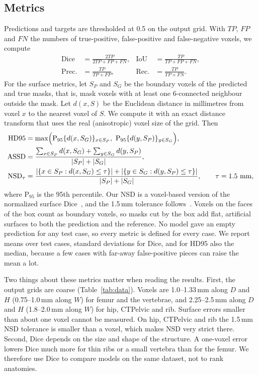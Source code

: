 \documentclass[11pt]{article}
\begin{document}
\subsection{Metrics}
Predictions and targets are thresholded at 0.5 on the output grid. With $TP$, $FP$ and $FN$ the numbers of true-positive, false-positive and false-negative voxels, we compute
\begin{align}
\mathrm{Dice}&=\frac{2TP}{2TP+FP+FN}, & \mathrm{IoU}&=\frac{TP}{TP+FP+FN},\nonumber\\
\mathrm{Prec.}&=\frac{TP}{TP+FP}, & \mathrm{Rec.}&=\frac{TP}{TP+FN}.
\end{align}
For the surface metrics, let $S_P$ and $S_G$ be the boundary voxels of the predicted and true masks, that is, mask voxels with at least one 6-connected neighbour outside the mask. Let $d(x,S)$ be the Euclidean distance in millimetres from voxel $x$ to the nearest voxel of $S$. We compute it with an exact distance transform that uses the real (anisotropic) voxel size of the grid. Then
\begin{align}
\mathrm{HD95}&=\max\Bigl(\mathrm{P}_{95}\{d(x,S_G)\}_{x\in S_P},\ \mathrm{P}_{95}\{d(y,S_P)\}_{y\in S_G}\Bigr),\\
\mathrm{ASSD}&=\frac{\sum_{x\in S_P}d(x,S_G)+\sum_{y\in S_G}d(y,S_P)}{|S_P|+|S_G|},\\
\mathrm{NSD}_\tau&=\frac{|\{x\in S_P:d(x,S_G)\le\tau\}|+|\{y\in S_G:d(y,S_P)\le\tau\}|}{|S_P|+|S_G|},\qquad\tau=1.5\ \mathrm{mm},
\end{align}
where $\mathrm{P}_{95}$ is the 95th percentile. Our NSD is a voxel-based version of the normalized surface Dice~\cite{nikolov2021}, and the 1.5\,mm tolerance follows~\cite{shakya2023}. Voxels on the faces of the box count as boundary voxels, so masks cut by the box add flat, artificial surfaces to both the prediction and the reference. No model gave an empty prediction for any test case, so every metric is defined for every case. We report means over test cases, standard deviations for Dice, and for HD95 also the median, because a few cases with far-away false-positive pieces can raise the mean a lot.

Two things about these metrics matter when reading the results. First, the output grids are coarse (Table~\ref{tab:data}). Voxels are 1.0--1.33\,mm along $D$ and $H$ (0.75--1.0\,mm along $W$) for femur and the vertebrae, and 2.25--2.5\,mm along $D$ and $H$ (1.8--2.0\,mm along $W$) for hip, CTPelvic and rib. Surface errors smaller than about one voxel cannot be measured. On hip, CTPelvic and rib the 1.5\,mm NSD tolerance is smaller than a voxel, which makes NSD very strict there. Second, Dice depends on the size and shape of the structure. A one-voxel error lowers Dice much more for thin ribs or a small vertebra than for the femur. We therefore use Dice to compare models on the same dataset, not to rank anatomies.
\end{document}
